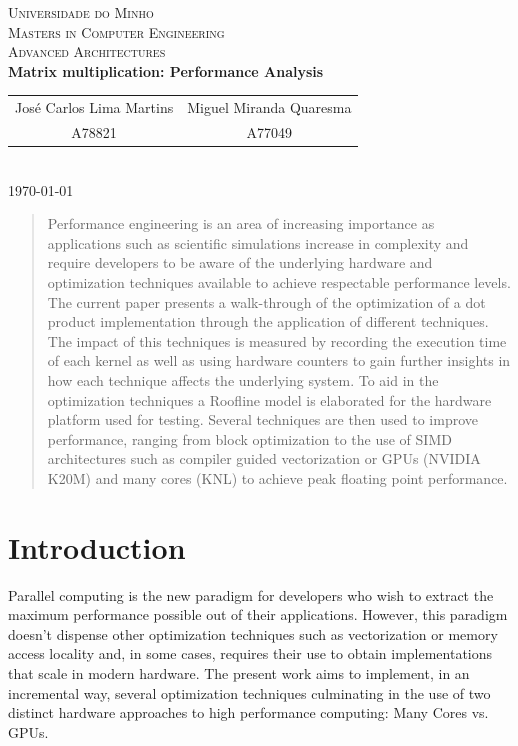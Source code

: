 \documentclass{article}
\begin{document}
{
\center
\textsc{\Large Universidade do Minho} \\ [0.5cm]
\textsc{\Large Masters in Computer Engineering} \\ [0.5cm]
\textsc{\large Advanced Architectures} \\ [0.5cm]

{\LARGE \bfseries Matrix multiplication: Performance Analysis} \\[0.5cm]

\begin{tabular}{c c}
    José Carlos Lima Martins & Miguel Miranda Quaresma \\
    A78821 & A77049  \\
\end{tabular} \\[0.5cm]

\today \\[1cm]
}

\begin{abstract}
Performance engineering is an area of increasing importance as applications such as scientific simulations increase in complexity and require developers to be aware 
of the underlying hardware and optimization techniques available to achieve respectable performance levels. The current paper presents a walk-through of the
optimization of a dot product implementation through the application of different techniques. The impact of this techniques is measured by recording the execution
time of each kernel as well as using hardware counters to gain further insights in how each technique affects the underlying system. To aid in the optimization 
techniques a Roofline model is elaborated for the hardware platform used for testing. Several techniques are then used to improve performance, ranging from block optimization to the use of SIMD architectures such as compiler guided vectorization or GPUs (NVIDIA K20M) and many cores (KNL) to achieve peak floating point performance. 
\end{abstract}

\section{Introduction}
Parallel computing is the new paradigm for developers who wish to extract the maximum performance possible out of their applications. However, this 
paradigm doesn't dispense other optimization techniques such as vectorization or memory access locality and, in some cases, requires their use to obtain implementations that scale in modern hardware. The present work aims to implement, in an incremental way, several optimization techniques culminating in the use of two
distinct hardware approaches to high performance computing: Many Cores vs. GPUs. 
\end{document}
